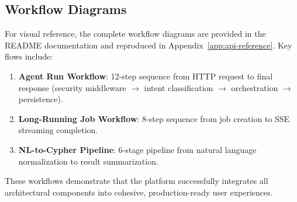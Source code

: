 \subsection{Workflow Diagrams}

For visual reference, the complete workflow diagrams are provided in the README documentation and reproduced in Appendix~\ref{app:api-reference}. Key flows include:

\begin{enumerate}
    \item \textbf{Agent Run Workflow}: 12-step sequence from HTTP request to final response (security middleware $\rightarrow$ intent classification $\rightarrow$ orchestration $\rightarrow$ persistence).
    
    \item \textbf{Long-Running Job Workflow}: 8-step sequence from job creation to SSE streaming completion.
    
    \item \textbf{NL-to-Cypher Pipeline}: 6-stage pipeline from natural language normalization to result summarization.
\end{enumerate}

These workflows demonstrate that the platform successfully integrates all architectural components into cohesive, production-ready user experiences.

